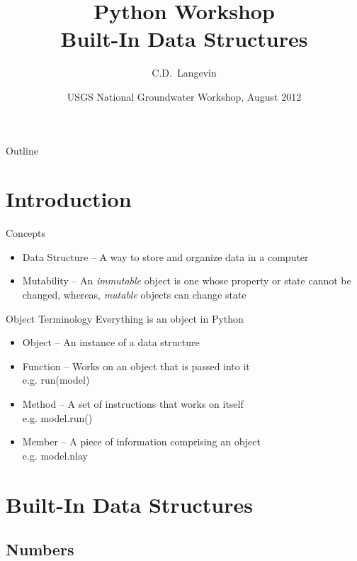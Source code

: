 \documentclass{beamer}
\title[]{Python Workshop\\
Built-In Data Structures}
\author[Langevin] %
{C.D.~Langevin}
\institute[USGS] %
{
  U.S. Geological Survey\\
  Reston, Virginia, USA
  }
\date[UQ12] %
{USGS National Groundwater Workshop, August 2012}
\begin{document}
\begin{frame}
  \titlepage
\end{frame}

\begin{frame}{Outline}
\tableofcontents
\end{frame}

\section{Introduction}
\begin{frame}[fragile]{Concepts}
\begin{itemize}
\item{Data Structure -- A way to store and organize data in a computer}
\item{Mutability -- An \emph{immutable} object is one whose property or state cannot be changed, whereas, \emph{mutable} objects can change state}
\end{itemize}
\end{frame}

\begin{frame}[fragile]{Object Terminology}
Everything is an object in Python
\begin{itemize}
\item{Object -- An instance of a data structure}
\item{Function -- Works on an object that is passed into it\\ e.g. run(model)}
\item{Method -- A set of instructions that works on itself\\ e.g. model.run()}
\item{Member -- A piece of information comprising an object\\ e.g. model.nlay}
\end{itemize}
\end{frame}


\section{Built-In Data Structures}

\subsection{Numbers}
\end{document}
